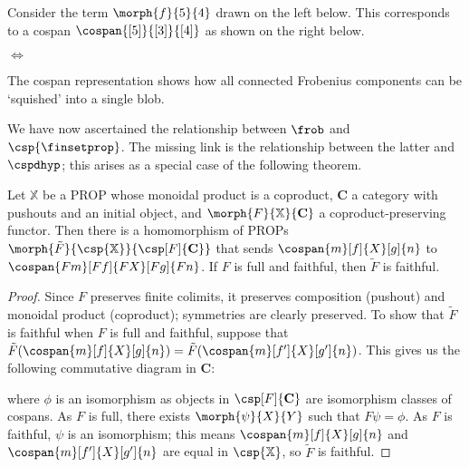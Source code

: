\begin{example}
    Consider the term \(\morph{f}{5}{4}\) drawn on the left below.
    This corresponds to a cospan \(\cospan{[5]}{[3]}{[4]}\) as shown on the
    right below.
    \begin{center}
        \(\Leftrightarrow\)
    \end{center}
\end{example}

The cospan representation shows how all connected Frobenius components can be
`squished' into a single blob.

We have now ascertained the relationship between \(\frob\) and
\(\csp{\finsetprop}\).
The missing link is the relationship between the latter and \(\cspdhyp\);
this arises as a special case of the following theorem.

\begin{theorem}
    \label{thm:cospan-homomorphism}
    Let \(\mathbb{X}\) be a PROP whose monoidal product is a coproduct,
    \(\mathbf{C}\) a category with pushouts and an initial object, and
    \(\morph{F}{\mathbb{X}}{\mathbf{C}}\) a coproduct-preserving functor.
    Then there is a homomorphism of PROPs \(
    \morph{\tilde{F}}{\csp{\mathbb{X}}}{\csp[F]{\mathbf{C}}}
    \) that sends \(\cospan{m}[f]{X}[g]{n}\) to
    \(\cospan{Fm}[Ff]{FX}[Fg]{Fn}\).
    If \(F\) is full and faithful, then \(\tilde{F}\) is faithful.
\end{theorem}
\begin{proof}
    Since \(F\) preserves finite colimits, it preserves composition (pushout)
    and monoidal product (coproduct); symmetries are clearly preserved.
    To show that \(\tilde{F}\) is faithful when \(F\) is full and faithful,
    suppose that \(
    \tilde{F}(\cospan{m}[f]{X}[g]{n})
    =
    \tilde{F}(\cospan{m}[f^\prime]{X}[g^\prime]{n})
    \).
    This gives us the following commutative diagram in \(\mathbf{C}\):
    \begin{center}
    \end{center}
    where \(\phi\) is an isomorphism as objects in \(\csp[F]{\mathbf{C}}\) are
    isomorphism classes of cospans.
    As \(F\) is full, there exists \(\morph{\psi}{X}{Y}\) such that
    \(F\psi = \phi\).
    As \(F\) is faithful, \(\psi\) is an isomorphism; this means
    \(\cospan{m}[f]{X}[g]{n}\) and \(\cospan{m}[f^\prime]{X}[g^\prime]{n}\) are
    equal in \(\csp{\mathbb{X}}\), so \(\tilde{F}\) is faithful.
\end{proof}

